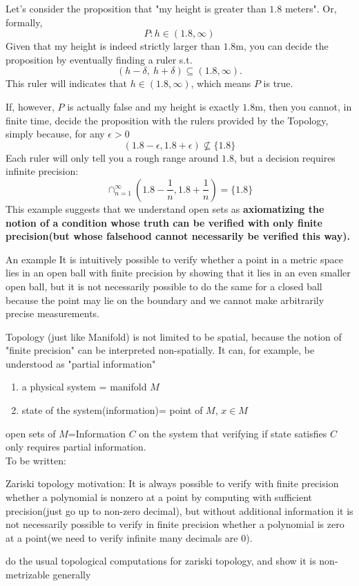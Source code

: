 \documentclass[12pt, a4paper]{article}
\theoremstyle{definition}
\begin{document}
Let's consider the proposition that "my height is greater than $1.8$ meters". Or, formally, 
$$
P: h\in (1.8,\infty)
$$
Given that my height is indeed strictly larger than $1.8$m,  you can decide  the proposition by eventually finding a ruler s.t. 
\[
(h-\delta,\ h+\delta)\subseteq(1.8,\infty).
\]
This ruler will indicates that $h\in (1.8,\infty)$, which means $P$ is true. 

If, however, $P$ is actually false and my height is exactly $1.8$m, then you cannot, in finite time, decide the proposition with the rulers provided by the Topology, simply because,  for any $\epsilon>0$
$$
(1.8-\epsilon,1.8+\epsilon)\not\subseteq\{1.8\}
$$
Each ruler will only tell you a rough range around $1.8$, but a decision requires infinite precision:
$$
\cap_{n=1}^\infty (1.8-\frac{1}{n},1.8+\frac{1}{n})=\{1.8\}
$$
This example suggests that we understand open sets as\textbf{ } \textbf{axiomatizing the notion of a condition whose truth can be verified with only finite precision(but whose falsehood cannot necessarily be verified this way).} \\

\begin{mybox}{An example}
It is intuitively possible to verify whether a point in a metric space lies in an open ball with finite precision by showing that it lies in an even smaller open ball, but it is not necessarily possible to do the same for a closed ball because the point may lie on the boundary and we cannot make arbitrarily precise measurements.
\end{mybox}

 Topology (just like Manifold) is not limited to be spatial, because the notion of "finite precision" can be interpreted non-spatially. It can, for example, be understood as "partial information" 

\begin{enumerate}
    \item a physical system = manifold $M$
    \item state of the system(information)= point of $M$, $x\in M$
\end{enumerate}

open sets of $M$=Information $C$ on the system that verifying if state satisfies $C $ only requires partial information. \\

To be written:

Zariski topology motivation:
It is always possible to verify with finite precision  whether a polynomial is nonzero at a point by computing with sufficient precision(just go up to non-zero decimal), but without additional information it is not necessarily possible to verify in finite precision whether a polynomial is zero at a point(we need to verify infinite many decimals are 0).

do the usual topological computations for zariski topology, and show it is non-metrizable generally 
\end{document}
